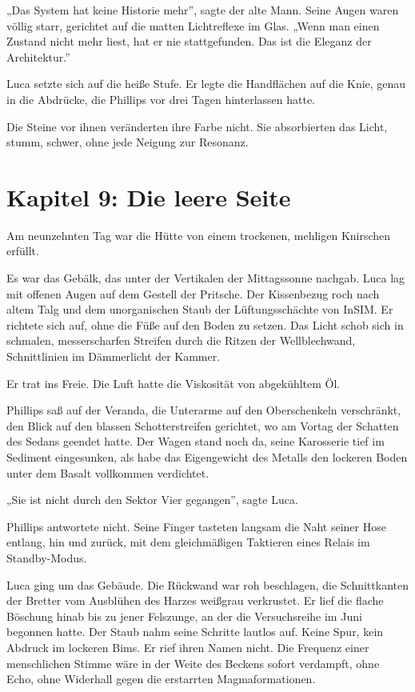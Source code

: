 \documentclass[
  ngerman,
]{article}
\begin{document}
„Das System hat keine Historie mehr'', sagte der alte Mann. Seine Augen
waren völlig starr, gerichtet auf die matten Lichtreflexe im Glas. „Wenn
man einen Zustand nicht mehr liest, hat er nie stattgefunden. Das ist
die Eleganz der Architektur.''

Luca setzte sich auf die heiße Stufe. Er legte die Handflächen auf die
Knie, genau in die Abdrücke, die Phillips vor drei Tagen hinterlassen
hatte.

Die Steine vor ihnen veränderten ihre Farbe nicht. Sie absorbierten das
Licht, stumm, schwer, ohne jede Neigung zur Resonanz.

\section{\texorpdfstring{\textbf{Kapitel 9: Die leere
Seite}}{Kapitel 9: Die leere Seite}}\label{kapitel-9-die-leere-seite}

Am neunzehnten Tag war die Hütte von einem trockenen, mehligen Knirschen
erfüllt.

Es war das Gebälk, das unter der Vertikalen der Mittagssonne nachgab.
Luca lag mit offenen Augen auf dem Gestell der Pritsche. Der Kissenbezug
roch nach altem Talg und dem unorganischen Staub der Lüftungsschächte
von InSIM. Er richtete sich auf, ohne die Füße auf den Boden zu setzen.
Das Licht schob sich in schmalen, messerscharfen Streifen durch die
Ritzen der Wellblechwand, Schnittlinien im Dämmerlicht der Kammer.

Er trat ins Freie. Die Luft hatte die Viskosität von abgekühltem Öl.

Phillips saß auf der Veranda, die Unterarme auf den Oberschenkeln
verschränkt, den Blick auf den blassen Schotterstreifen gerichtet, wo am
Vortag der Schatten des Sedans geendet hatte. Der Wagen stand noch da,
seine Karosserie tief im Sediment eingesunken, als habe das Eigengewicht
des Metalls den lockeren Boden unter dem Basalt vollkommen verdichtet.

„Sie ist nicht durch den Sektor Vier gegangen'', sagte Luca.

Phillips antwortete nicht. Seine Finger tasteten langsam die Naht seiner
Hose entlang, hin und zurück, mit dem gleichmäßigen Taktieren eines
Relais im Standby-Modus.

Luca ging um das Gebäude. Die Rückwand war roh beschlagen, die
Schnittkanten der Bretter vom Ausblühen des Harzes weißgrau verkrustet.
Er lief die flache Böschung hinab bis zu jener Felszunge, an der die
Versuchsreihe im Juni begonnen hatte. Der Staub nahm seine Schritte
lautlos auf. Keine Spur, kein Abdruck im lockeren Bims. Er rief ihren
Namen nicht. Die Frequenz einer menschlichen Stimme wäre in der Weite
des Beckens sofort verdampft, ohne Echo, ohne Widerhall gegen die
erstarrten Magmaformationen.
\end{document}

